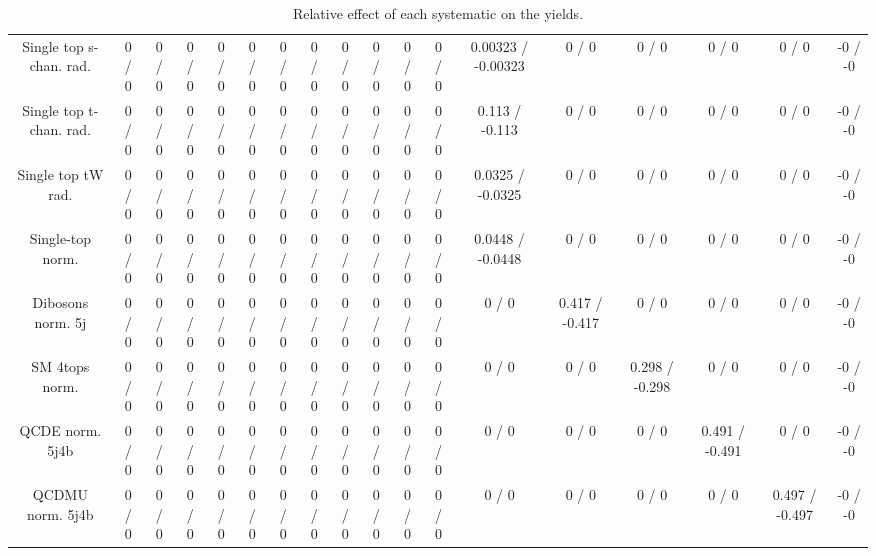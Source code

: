 \documentclass[10pt]{article}
\begin{document}
\begin{table}[htbp]
\begin{center}
\begin{tabular}{|c|c|c|c|c|c|c|c|c|c|c|c|c|c|c|c|c|c|}
  Single top s-chan. rad. & 0 / 0 & 0 / 0 & 0 / 0 & 0 / 0 & 0 / 0 & 0 / 0 & 0 / 0 & 0 / 0 & 0 / 0 & 0 / 0 & 0 / 0 & 0.00323 / -0.00323 & 0 / 0 & 0 / 0 & 0 / 0 & 0 / 0 & -0 / -0 \\ 
  Single top t-chan. rad. & 0 / 0 & 0 / 0 & 0 / 0 & 0 / 0 & 0 / 0 & 0 / 0 & 0 / 0 & 0 / 0 & 0 / 0 & 0 / 0 & 0 / 0 & 0.113 / -0.113 & 0 / 0 & 0 / 0 & 0 / 0 & 0 / 0 & -0 / -0 \\ 
  Single top tW rad. & 0 / 0 & 0 / 0 & 0 / 0 & 0 / 0 & 0 / 0 & 0 / 0 & 0 / 0 & 0 / 0 & 0 / 0 & 0 / 0 & 0 / 0 & 0.0325 / -0.0325 & 0 / 0 & 0 / 0 & 0 / 0 & 0 / 0 & -0 / -0 \\ 
  Single-top norm. & 0 / 0 & 0 / 0 & 0 / 0 & 0 / 0 & 0 / 0 & 0 / 0 & 0 / 0 & 0 / 0 & 0 / 0 & 0 / 0 & 0 / 0 & 0.0448 / -0.0448 & 0 / 0 & 0 / 0 & 0 / 0 & 0 / 0 & -0 / -0 \\ 
  Dibosons norm. 5j & 0 / 0 & 0 / 0 & 0 / 0 & 0 / 0 & 0 / 0 & 0 / 0 & 0 / 0 & 0 / 0 & 0 / 0 & 0 / 0 & 0 / 0 & 0 / 0 & 0.417 / -0.417 & 0 / 0 & 0 / 0 & 0 / 0 & -0 / -0 \\ 
  SM 4tops norm. & 0 / 0 & 0 / 0 & 0 / 0 & 0 / 0 & 0 / 0 & 0 / 0 & 0 / 0 & 0 / 0 & 0 / 0 & 0 / 0 & 0 / 0 & 0 / 0 & 0 / 0 & 0.298 / -0.298 & 0 / 0 & 0 / 0 & -0 / -0 \\ 
  QCDE norm. 5j4b & 0 / 0 & 0 / 0 & 0 / 0 & 0 / 0 & 0 / 0 & 0 / 0 & 0 / 0 & 0 / 0 & 0 / 0 & 0 / 0 & 0 / 0 & 0 / 0 & 0 / 0 & 0 / 0 & 0.491 / -0.491 & 0 / 0 & -0 / -0 \\ 
  QCDMU norm. 5j4b & 0 / 0 & 0 / 0 & 0 / 0 & 0 / 0 & 0 / 0 & 0 / 0 & 0 / 0 & 0 / 0 & 0 / 0 & 0 / 0 & 0 / 0 & 0 / 0 & 0 / 0 & 0 / 0 & 0 / 0 & 0.497 / -0.497 & -0 / -0 \\ 
\hline 
\end{tabular} 
\caption{Relative effect of each systematic on the yields.} 
\end{center} 
\end{table} 
\end{document}
